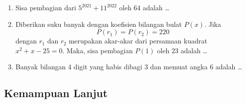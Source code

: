 \documentclass[12pt]{scrartcl}
\begin{document}
\begin{enumerate}
\item Sisa pembagian dari $5^{2021}+11^{2022}$ oleh 64 adalah \dots

\item Diberikan suku banyak dengan koefisien bilangan bulat $P(x)$. Jika
$$P(r_1)=P(r_2)=220$$
dengan $r_1$ dan $r_2$ merupakan akar-akar dari persamaan kuadrat $x^2+x-25=0$. Maka, sisa pembagian $P(1)$ oleh $23$ adalah \dots

\item Banyak bilangan 4 digit yang habis dibagi 3 dan memuat angka 6 adalah \dots
\end{enumerate}

\newpage
\subsection{Kemampuan Lanjut}
\end{document}
